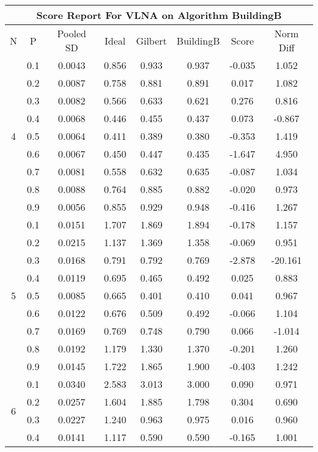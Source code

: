 \documentclass[11pt,a4paper]{report}
\begin{document}
\begin{longtable}{ | c | c || c | c | c | c | c | c | }
\hline
\multicolumn{8}{|c|}{ Score Report For VLNA on Algorithm BuildingB} \\
\hline
N & P & Pooled SD &  Ideal &  Gilbert & BuildingB  & Score & Norm Diff \\
 \hline
 \hline
 \endhead
\multirow{9}{*}{4} & 0.1 & 0.0043 & 0.856 & 0.933 & 0.937 & -0.035 & 1.052 \\
 & 0.2 & 0.0087 & 0.758 & 0.881 & 0.891 & 0.017 & 1.082 \\
 & 0.3 & 0.0082 & 0.566 & 0.633 & 0.621 & 0.276 & 0.816 \\
 & 0.4 & 0.0068 & 0.446 & 0.455 & 0.437 & 0.073 & -0.867 \\
 & 0.5 & 0.0064 & 0.411 & 0.389 & 0.380 & -0.353 & 1.419 \\
 & 0.6 & 0.0067 & 0.450 & 0.447 & 0.435 & -1.647 & 4.950 \\
 & 0.7 & 0.0081 & 0.558 & 0.632 & 0.635 & -0.087 & 1.034 \\
 & 0.8 & 0.0088 & 0.764 & 0.885 & 0.882 & -0.020 & 0.973 \\
 & 0.9 & 0.0056 & 0.855 & 0.929 & 0.948 & -0.416 & 1.267 \\
 \hline
\multirow{9}{*}{5} & 0.1 & 0.0151 & 1.707 & 1.869 & 1.894 & -0.178 & 1.157 \\
 & 0.2 & 0.0215 & 1.137 & 1.369 & 1.358 & -0.069 & 0.951 \\
 & 0.3 & 0.0168 & 0.791 & 0.792 & 0.769 & -2.878 & -20.161 \\
 & 0.4 & 0.0119 & 0.695 & 0.465 & 0.492 & 0.025 & 0.883 \\
 & 0.5 & 0.0085 & 0.665 & 0.401 & 0.410 & 0.041 & 0.967 \\
 & 0.6 & 0.0122 & 0.676 & 0.509 & 0.492 & -0.066 & 1.104 \\
 & 0.7 & 0.0169 & 0.769 & 0.748 & 0.790 & 0.066 & -1.014 \\
 & 0.8 & 0.0192 & 1.179 & 1.330 & 1.370 & -0.201 & 1.260 \\
 & 0.9 & 0.0145 & 1.722 & 1.865 & 1.900 & -0.403 & 1.242 \\
 \hline
\multirow{9}{*}{6} & 0.1 & 0.0340 & 2.583 & 3.013 & 3.000 & 0.090 & 0.971 \\
 & 0.2 & 0.0257 & 1.604 & 1.885 & 1.798 & 0.304 & 0.690 \\
 & 0.3 & 0.0227 & 1.240 & 0.963 & 0.975 & 0.016 & 0.960 \\
 & 0.4 & 0.0141 & 1.117 & 0.590 & 0.590 & -0.165 & 1.001 \\

\end{longtable}
\end{document}
